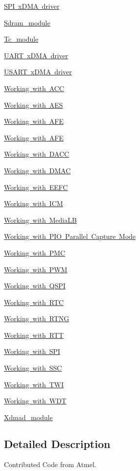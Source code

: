 \begin{DoxyCompactItemize}
\mbox{\hyperlink{group__spi__dma__module}{S\+P\+I x\+D\+M\+A driver}}
\item 
\mbox{\hyperlink{group__sdram__module}{Sdram\+\_\+module}}
\item 
\mbox{\hyperlink{group__tc__module}{Tc\+\_\+module}}
\item 
\mbox{\hyperlink{group__uart__dma__module}{U\+A\+R\+T x\+D\+M\+A driver}}
\item 
\mbox{\hyperlink{group__usart__dma__module}{U\+S\+A\+R\+T x\+D\+M\+A driver}}
\item 
\mbox{\hyperlink{group__acc__module}{Working with A\+CC}}
\item 
\mbox{\hyperlink{group__aes__module}{Working with A\+ES}}
\item 
\mbox{\hyperlink{group__AFEC__module}{Working with A\+FE}}
\item 
\mbox{\hyperlink{group__afe__dma__module}{Working with A\+FE}}
\item 
\mbox{\hyperlink{group__dacc__module}{Working with D\+A\+CC}}
\item 
\mbox{\hyperlink{group__dmac__module}{Working with D\+M\+AC}}
\item 
\mbox{\hyperlink{group__efc__module}{Working with E\+E\+FC}}
\item 
\mbox{\hyperlink{group__icm__module}{Working with I\+CM}}
\item 
\mbox{\hyperlink{group__mediaLB}{Working with Media\+LB}}
\item 
\mbox{\hyperlink{group__pio__capture__module}{Working with P\+I\+O Parallel Capture Mode}}
\item 
\mbox{\hyperlink{group__pmc__module}{Working with P\+MC}}
\item 
\mbox{\hyperlink{group__pwm__module}{Working with P\+WM}}
\item 
\mbox{\hyperlink{group__qspi__module}{Working with Q\+S\+PI}}
\item 
\mbox{\hyperlink{group__rtc__module}{Working with R\+TC}}
\item 
\mbox{\hyperlink{group__rtng__module}{Working with R\+T\+NG}}
\item 
\mbox{\hyperlink{group__rtt__module}{Working with R\+TT}}
\item 
\mbox{\hyperlink{group__spi__module}{Working with S\+PI}}
\item 
\mbox{\hyperlink{group__ssc__module}{Working with S\+SC}}
\item 
\mbox{\hyperlink{group__twi__module}{Working with T\+WI}}
\item 
\mbox{\hyperlink{group__wdt__module}{Working with W\+DT}}
\item 
\mbox{\hyperlink{group__xdmad__module}{Xdmad\+\_\+module}}
\end{DoxyCompactItemize}


\subsection{Detailed Description}
Contributed Code from Atmel. 

